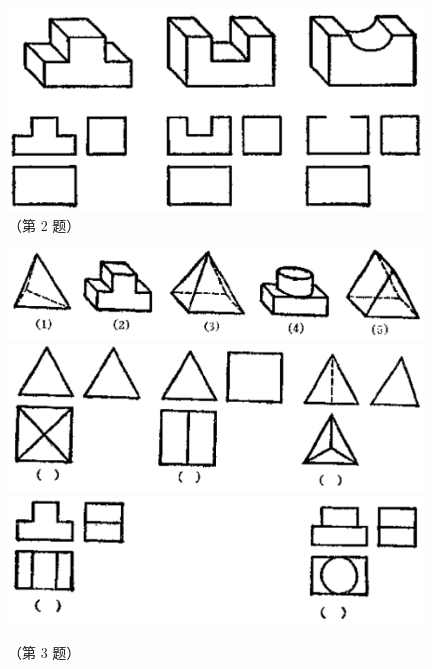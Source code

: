 \begin{lianxi}



\begin{figure}[htbp]
    \centering
    \includegraphics[width=11cm]{../pic/czjh2-ch8-subsec4-lx-02.png}
    \caption*{（第 2 题）}
\end{figure}


\begin{figure}[htbp]
    \centering
    \includegraphics[width=11cm]{../pic/czjh2-ch8-subsec4-lx-03-1.png}
    \includegraphics[width=11cm]{../pic/czjh2-ch8-subsec4-lx-03-2.png}
    \includegraphics[width=11cm]{../pic/czjh2-ch8-subsec4-lx-03-3.png}
    \caption*{（第 3 题）}
\end{figure}

\end{lianxi}

